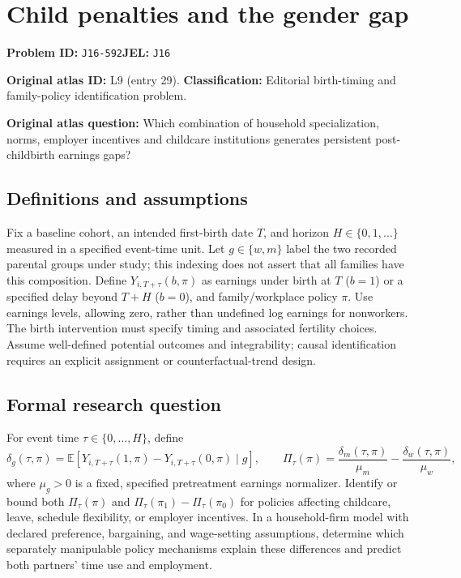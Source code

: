 \documentclass[11pt,a4paper]{article}
\begin{document}
\section*{Child penalties and the gender gap}
\textbf{Problem ID:} \texttt{J16-592}\quad \textbf{JEL:} \texttt{J16}\par
\label{problem:OP-0029}
\label{atlas:prob:L9}
\noindent\textbf{Original atlas ID:} L9 (entry 29). \textbf{Classification:} Editorial birth-timing and family-policy identification problem.

\noindent\textbf{Original atlas question:} Which combination of household specialization, norms, employer incentives and childcare institutions generates persistent post-childbirth earnings gaps?

\subsection*{Definitions and assumptions}
Fix a baseline cohort, an intended first-birth date $T$, and horizon $H\in\{0,1,\ldots\}$ measured in a specified event-time unit. Let $g\in\{w,m\}$ label the two recorded parental groups under study; this indexing does not assert that all families have this composition. Define $Y_{i,T+\tau}(b,\pi)$ as earnings under birth at $T$ ($b=1$) or a specified delay beyond $T+H$ ($b=0$), and family/workplace policy $\pi$. Use earnings levels, allowing zero, rather than undefined log earnings for nonworkers. The birth intervention must specify timing and associated fertility choices. Assume well-defined potential outcomes and integrability; causal identification requires an explicit assignment or counterfactual-trend design.
\subsection*{Formal research question}
For event time $\tau\in\{0,\ldots,H\}$, define
\[
 \delta_g(\tau,\pi)=\mathbb E[Y_{i,T+\tau}(1,\pi)-Y_{i,T+\tau}(0,\pi)\mid g],
 \qquad
 \Pi_\tau(\pi)=\frac{\delta_m(\tau,\pi)}{\mu_m}
                 -\frac{\delta_w(\tau,\pi)}{\mu_w},
\]
where $\mu_g>0$ is a fixed, specified pretreatment earnings normalizer. Identify or bound both $\Pi_\tau(\pi)$ and $\Pi_\tau(\pi_1)-\Pi_\tau(\pi_0)$ for policies affecting childcare, leave, schedule flexibility, or employer incentives. In a household-firm model with declared preference, bargaining, and wage-setting assumptions, determine which separately manipulable policy mechanisms explain these differences and predict both partners' time use and employment.
\end{document}
